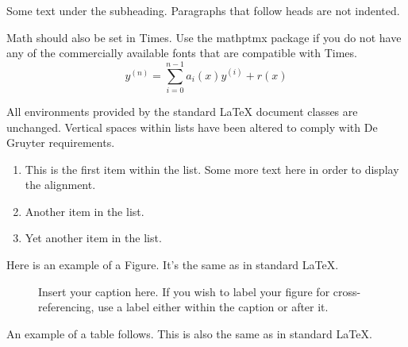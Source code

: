 \documentclass[letterpaper,12pt]{article}
\begin{document}
Some text under the subheading. Paragraphs that follow heads are not
indented.

Math should also be set in Times. Use the mathptmx package if you do not have
any of the commercially available fonts that are compatible with Times.
\begin{equation}
    y^{(n)} = \sum_{i=0}^{n-1} a_i(x) y^{(i)} + r(x) 
\end{equation}

All environments provided by the standard LaTeX document classes are
unchanged. Vertical spaces within lists have been altered to comply with De Gruyter
requirements.
\begin{enumerate}
\item This is the first item within the list. Some more text here in order to
  display the alignment.
\item Another item in the list.
\item Yet another item in the list.
\end{enumerate}

Here is an example of a Figure. It's the same as in standard LaTeX.

\begin{figure}[!h]
\centering
\caption{Insert your caption here. If you wish to label your figure for
  cross-referencing, use a label either within the caption or after it.}
\label{fig1}
\end{figure}

An example of a table follows. This is also the same as in standard LaTeX.
\end{document}
